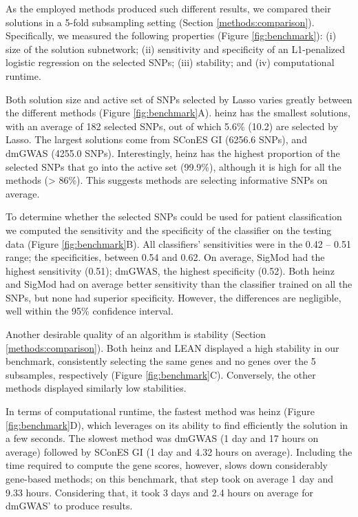 \documentclass[twocolumn, 10pt]{article}
\begin{document}
As the employed methods produced such different results, we compared their solutions in a 5-fold subsampling setting (Section \ref{methods:comparison}). Specifically, we measured the following properties (Figure \ref{fig:benchmark}): (i) size of the solution subnetwork; (ii) sensitivity and specificity of an L1-penalized logistic regression on the selected SNPs; (iii) stability; and (iv) computational runtime.

Both solution size and active set of SNPs selected by Lasso varies greatly between the different methods (Figure \ref{fig:benchmark}A). heinz has the smallest solutions, with an average of 182 selected SNPs, out of which 5.6\% (10.2) are selected by Lasso. The largest solutions come from SConES GI (6256.6 SNPs), and dmGWAS (4255.0 SNPs). Interestingly, heinz has the highest proportion of the selected SNPs that go into the active set (99.9\%), although it is  high for all the methods (> 86\%). This suggests methods are selecting informative SNPs on average. 

To determine whether the selected SNPs could be used for patient classification we computed the sensitivity and the specificity of the classifier on the testing data (Figure \ref{fig:benchmark}B). All classifiers' sensitivities were in the 0.42 -- 0.51 range; the specificities, between 0.54 and 0.62. On average, SigMod had the highest sensitivity (0.51); dmGWAS, the highest specificity (0.52). Both heinz and SigMod had on average better sensitivity than the classifier trained on all the SNPs, but none had superior specificity. However, the differences are negligible, well within the 95\% confidence interval.   

Another desirable quality of an algorithm is stability (Section \ref{methods:comparison}). Both heinz and LEAN displayed a high stability in our benchmark, consistently selecting the same genes and no genes over the 5 subsamples, respectively (Figure \ref{fig:benchmark}C). Conversely, the other methods displayed similarly low stabilities. 

In terms of computational runtime, the fastest method was heinz (Figure \ref{fig:benchmark}D), which leverages on its ability to find efficiently the solution in a few seconds. The slowest method was dmGWAS (1 day and 17 hours on average) followed by SConES GI (1 day and 4.32 hours on average). Including the time required to compute the gene scores, however, slows down considerably gene-based methods; on this benchmark, that step took on average 1 day and 9.33 hours. Considering that, it took 3 days and 2.4 hours on average for dmGWAS' to produce results. 
\end{document}
